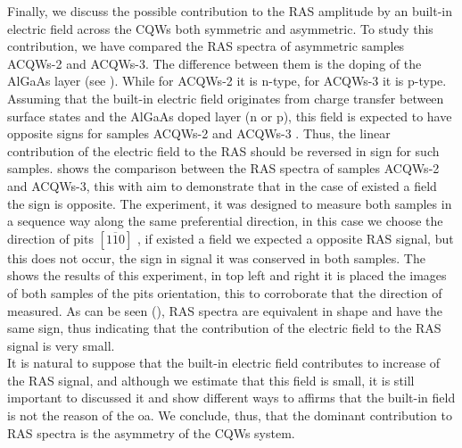 Finally, we discuss the possible contribution to the RAS amplitude by an built-in electric field across the CQWs both symmetric and asymmetric. To study this contribution, we have compared the RAS spectra of asymmetric samples \gls{ACQWs}-2 and \gls{ACQWs}-3. The difference between them is the doping of the AlGaAs layer (see ). While for \gls{ACQWs}-2 it is n-type, for \gls{ACQWs}-3 it is p-type. Assuming that the built-in electric field  originates from charge transfer between surface states and  the AlGaAs doped layer (n or p), this field is expected to have opposite signs for samples \gls{ACQWs}-2 and \gls{ACQWs}-3 . Thus, the linear contribution of the electric field to the \gls{RAS} should be reversed in sign for such samples.  shows the comparison between the \gls{RAS} spectra of samples \gls{ACQWs}-2 and \gls{ACQWs}-3,  this with aim to demonstrate that  in the case of existed a field the sign is opposite.    The experiment, it was designed to measure both samples in a sequence way along the same preferential direction, in this case we choose the direction of pits $\left[1\overline{1}0\right]$ \cite{weyher2010defect}, if existed a field we expected a opposite RAS signal, but this does not occur, the sign in signal it was conserved in both samples. The  shows the results of this experiment, in top left and right it is placed the images of both samples of the pits orientation, this to corroborate that the direction of measured. 
As can be seen (), RAS spectra are equivalent in shape and have the same sign, thus indicating that the contribution of the electric field to the \gls{RAS} signal is very small. \\

It is natural to suppose that the built-in electric field contributes to increase of the \gls{RAS} signal, and although  we estimate that this field is small, it is still important to discussed it and show different ways to affirms that  the built-in field is not the reason of the \gls{oa}. 
We conclude, thus, that the dominant contribution to \gls{RAS} spectra is the asymmetry of the \gls{CQWs} system. 

